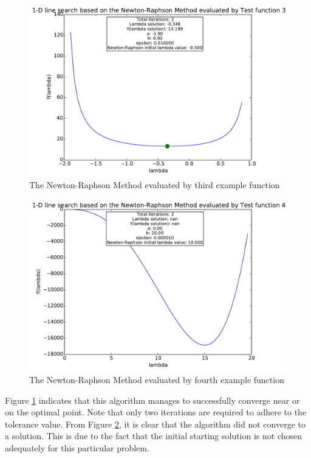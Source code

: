 \documentclass[a4paper,10pt]{article}
\begin{document}
\newpage
\begin{figure}[h]
\centering
 \includegraphics[scale=0.55]{./graphs/algorithm1/x_in_middel/testFunction3.pdf} 
 \caption{The Newton-Raphson Method evaluated by third example function}
 \label{fig:alg1test3}
\end{figure}

\begin{figure}[h]
\centering
 \includegraphics[scale=0.55]{./graphs/algorithm1/x_in_middel/testFunction4.pdf} 
 \caption{The Newton-Raphson Method evaluated by fourth example function}
 \label{fig:alg1test4}
\end{figure}

Figure \ref{fig:alg1test3} indicates that this algorithm manages to successfully converge near or on the optimal point. Note that only two iterations are required to adhere to the tolerance value. From Figure \ref{fig:alg1test4}, it is clear that the algorithm did not converge to a solution. This is due to the fact that the initial starting solution is not chosen adequately for this particular problem. 
\end{document}
